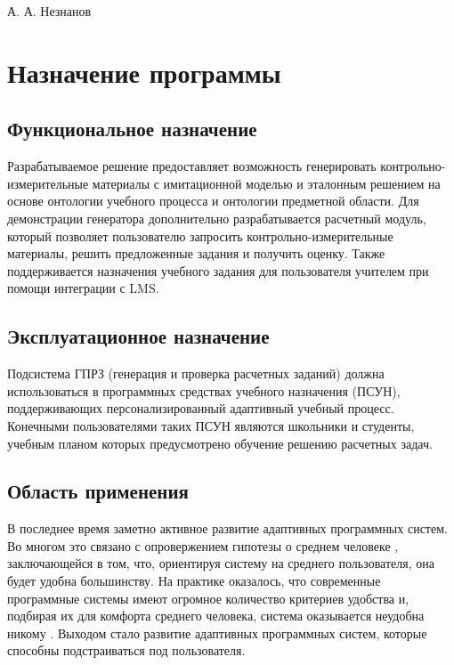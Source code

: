 \documentclass[a4paper,12pt,reqno]{article}
\begin{document}




    {А. А. Незнанов}

    \firstPage
    \newpage
    \secondPage
    \newpage
    \thirdPage
    \newpage


    \section{Назначение программы}

    \subsection{Функциональное назначение}
    Разрабатываемое решение предоставляет возможность генерировать контрольно-измерительные материалы с имитационной моделью и эталонным решением на основе онтологии учебного процесса и онтологии предметной области. Для демонстрации генератора дополнительно разрабатывается расчетный модуль, который позволяет пользователю запросить контрольно-измерительные материалы, решить предложенные задания и получить оценку. Также поддерживается назначения учебного задания для пользователя учителем при помощи интеграции с LMS.

    \subsection{Эксплуатационное назначение}
    Подсистема ГПРЗ (генерация и проверка расчетных заданий) должна использоваться в программных средствах учебного назначения (ПСУН), поддерживающих персонализированный адаптивный учебный процесс. Конечными пользователями таких ПСУН являются школьники и студенты, учебным планом которых предусмотрено обучение решению расчетных задач.

    \subsection{Область применения}
    В последнее время заметно активное развитие адаптивных программных систем. Во многом это связано с опровержением гипотезы о среднем человеке \cite{introduction:average_person}, заключающейся в том, что, ориентируя систему на среднего пользователя, она будет удобна большинству. На практике оказалось, что современные программные системы имеют огромное количество критериев удобства и, подбирая их для комфорта среднего человека, система оказывается неудобна никому \cite{introduction:average_person_UX}. Выходом стало развитие адаптивных программных систем, которые способны подстраиваться под пользователя.
\end{document}
